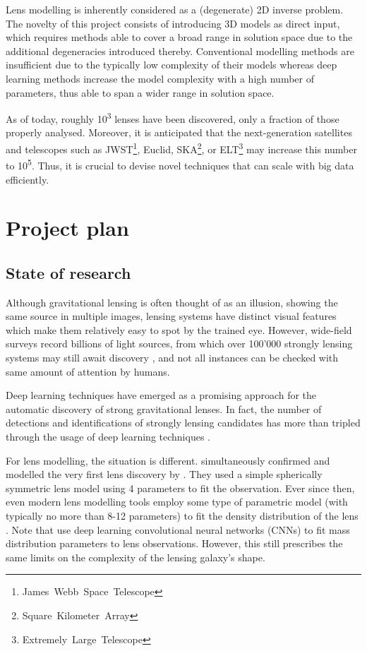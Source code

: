 \documentclass[a4paper,10pt]{article}
\begin{document}
Lens modelling is inherently considered as a (degenerate) 2D inverse
problem. The novelty of this project consists of introducing 3D models
as direct input, which requires methods able to cover a broad range in
solution space due to the additional degeneracies introduced
thereby. Conventional modelling methods are insufficient due to the
typically low complexity of their models whereas deep learning methods
increase the model complexity with a high number of parameters, thus
able to span a wider range in solution space.

As of today, roughly 10\textsuperscript{3} lenses have been discovered, only a fraction
of those properly analysed. Moreover, it is anticipated that the
next-generation satellites and telescopes such as
JWST\footnote{James~Webb~Space~Telescope}, Euclid,
SKA\footnote{Square~Kilometer~Array}, or
ELT\footnote{Extremely~Large~Telescope} may increase this number to
10\textsuperscript{5}. Thus, it is crucial to devise novel techniques that can scale
with big data efficiently.


\newpage
\section*{Project plan}
\label{sec:orgb439678}

\subsection*{State of research}
\label{sec:org7dd05ca}

Although gravitational lensing is often thought of as an illusion,
showing the same source in multiple images, lensing systems have
distinct visual features which make them relatively easy to spot by
the trained eye. However, wide-field surveys record billions of light
sources, from which over 100'000 strongly lensing systems may still
await discovery \citep{Taak20,Taak23,Collett15}, and not all
instances can be checked with same amount of attention by humans.

Deep learning techniques have emerged as a promising approach for the
automatic discovery of strong gravitational lenses. In fact, the
number of detections and identifications of strongly lensing
candidates has more than tripled through the usage of deep learning
techniques \citep{Storfer22,Huang21,Rezaei22,Wilde22}.

For lens modelling, the situation is different. \cite{Young80}
simultaneously confirmed and modelled the very first lens discovery by
\cite{Walsh79}. They used a simple spherically symmetric lens model
using 4 parameters to fit the observation. Ever since then, even
modern lens modelling tools employ some type of parametric model (with
typically no more than 8-12 parameters) to fit the density
distribution of the lens
\citep[cf.][]{Birrer18,Hezaveh17,Tessore16,Oguri10}. Note that
\cite{Hezaveh17} use deep learning convolutional neural networks
(CNNs) to fit mass distribution parameters to lens
observations. However, this still prescribes the same limits on the
complexity of the lensing galaxy's shape.
\end{document}

